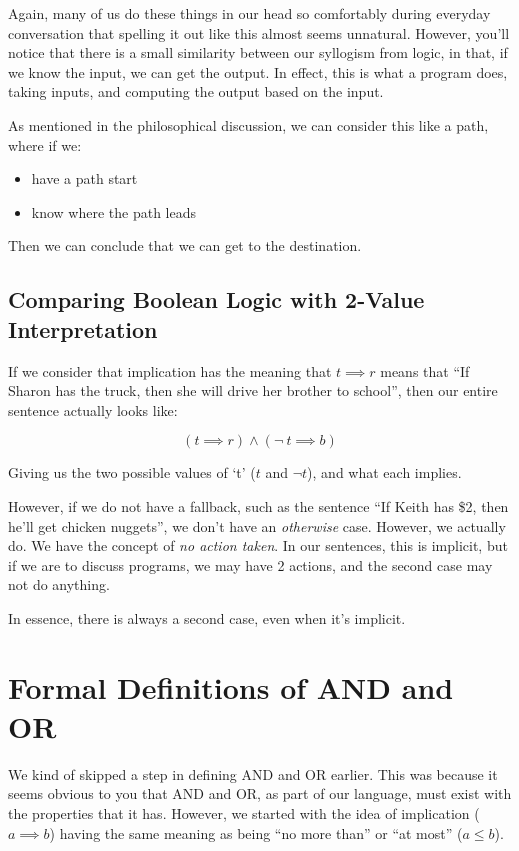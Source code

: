 Again, many of us do these things in our head so comfortably during everyday conversation that spelling it out like this almost seems unnatural. However, you'll notice that there is a small similarity between our syllogism from logic, in that, if we know the input, we can get the output. In effect, this is what a program does, taking inputs, and computing the output based on the input.

As mentioned in the philosophical discussion, we can consider this like a path, where if we:
\begin{itemize}
    \item have a path start
    \item know where the path leads
\end{itemize}

Then we can conclude that we can get to the destination.

\subsection{Comparing Boolean Logic with 2-Value Interpretation}
If we consider that implication has the meaning that $t \implies r$ means that ``If Sharon has the truck, then she will drive her brother to school'', then our entire sentence actually looks like:

$$
    (t \implies r) \wedge (\neg\ t \implies b)
$$

Giving us the two possible values of `t' ($t$ and $\neg t$), and what each implies.

However, if we do not have a fallback, such as the sentence ``If Keith has \$2, then he'll get chicken nuggets'', we don't have an \emph{otherwise} case. However, we actually do. We have the concept of \emph{no action taken}. In our sentences, this is implicit, but if we are to discuss programs, we may have 2 actions, and the second case may not do anything.

In essence, there is always a second case, even when it's implicit.
\section{Formal Definitions of AND and OR}
We kind of skipped a step in defining AND and OR earlier. This was because it seems obvious to you that AND and OR, as part of our language, must exist with the properties that it has. However, we started with the idea of implication ($a \implies b$) having the same meaning as being ``no more than'' or ``at most'' ($a \leq b$).

